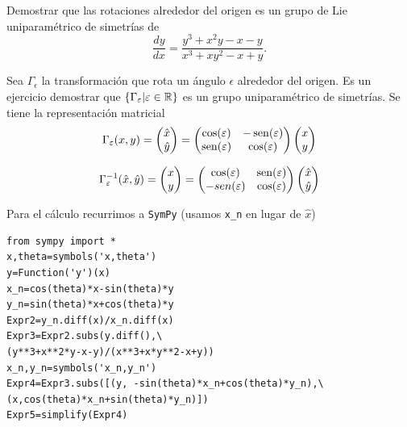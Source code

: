 \begin{ejemplo}
 Demostrar que las rotaciones alrededor del origen es un grupo de Lie uniparamétrico de simetrías de
 \[\frac{dy}{dx}=\frac{y^3+x^2y-x-y}{x^3+xy^2-x+y}.\]
\end{ejemplo}
Sea $\Gamma_{\epsilon}$ la transformación que rota un ángulo $\epsilon$ alrededor del origen. Es un ejercicio demostrar que  $\{\Gamma_{\varepsilon}|\varepsilon\in\mathbb{R}\}$ es un grupo uniparamétrico de simetrías. Se tiene la representación matricial
\[
\Gamma_{\varepsilon}(x,y)= \begin{pmatrix} \hat{x}\\ \hat{y}
\end{pmatrix}=\begin{pmatrix} \cos(\varepsilon) & -\operatorname{sen}(\varepsilon)
\\ \operatorname{sen}(\varepsilon) & \cos(\varepsilon)
\end{pmatrix} \begin{pmatrix} x\\ y
\end{pmatrix}
\]

\[
\Gamma^{-1}_{\varepsilon}(\hat{x},\hat{y})= \begin{pmatrix} x\\ y
\end{pmatrix}=\begin{pmatrix} \cos(\varepsilon) & \operatorname{sen}(\varepsilon)
\\ -sen(\varepsilon) & \cos(\varepsilon)
\end{pmatrix} \begin{pmatrix} \hat{x}\\ \hat{y}
\end{pmatrix}
\]


Para el cálculo recurrimos a \texttt{SymPy} (usamos \texttt{x\_n} en lugar de $\hat{x}$)
\begin{lstlisting}
from sympy import *
x,theta=symbols('x,theta')
y=Function('y')(x)
x_n=cos(theta)*x-sin(theta)*y
y_n=sin(theta)*x+cos(theta)*y
Expr2=y_n.diff(x)/x_n.diff(x)
Expr3=Expr2.subs(y.diff(),\
(y**3+x**2*y-x-y)/(x**3+x*y**2-x+y))
x_n,y_n=symbols('x_n,y_n')
Expr4=Expr3.subs([(y, -sin(theta)*x_n+cos(theta)*y_n),\
(x,cos(theta)*x_n+sin(theta)*y_n)])
Expr5=simplify(Expr4)
\end{lstlisting}



